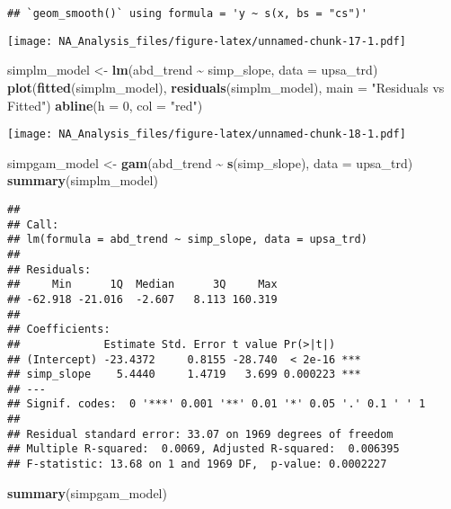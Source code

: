 \documentclass[
]{article}
\newenvironment{Shaded}{\begin{snugshade}}{\end{snugshade}}
\newcommand{\AttributeTok}[1]{\textcolor[rgb]{0.13,0.29,0.53}{#1}}
\newcommand{\DecValTok}[1]{\textcolor[rgb]{0.00,0.00,0.81}{#1}}
\newcommand{\FunctionTok}[1]{\textcolor[rgb]{0.13,0.29,0.53}{\textbf{#1}}}
\newcommand{\NormalTok}[1]{#1}
\newcommand{\OtherTok}[1]{\textcolor[rgb]{0.56,0.35,0.01}{#1}}
\newcommand{\SpecialCharTok}[1]{\textcolor[rgb]{0.81,0.36,0.00}{\textbf{#1}}}
\newcommand{\StringTok}[1]{\textcolor[rgb]{0.31,0.60,0.02}{#1}}
\begin{document}
\begin{verbatim}
## `geom_smooth()` using formula = 'y ~ s(x, bs = "cs")'
\end{verbatim}

\texttt{[image: NA\_Analysis\_files/figure-latex/unnamed-chunk-17-1.pdf]}

\begin{Shaded}
\begin{Highlighting}[]
\NormalTok{simplm\_model }\OtherTok{\textless{}{-}} \FunctionTok{lm}\NormalTok{(abd\_trend }\SpecialCharTok{\textasciitilde{}}\NormalTok{ simp\_slope, }\AttributeTok{data =}\NormalTok{ upsa\_trd)}
\FunctionTok{plot}\NormalTok{(}\FunctionTok{fitted}\NormalTok{(simplm\_model), }\FunctionTok{residuals}\NormalTok{(simplm\_model), }\AttributeTok{main =} \StringTok{"Residuals vs Fitted"}\NormalTok{)}
\FunctionTok{abline}\NormalTok{(}\AttributeTok{h =} \DecValTok{0}\NormalTok{, }\AttributeTok{col =} \StringTok{"red"}\NormalTok{)}
\end{Highlighting}
\end{Shaded}

\texttt{[image: NA\_Analysis\_files/figure-latex/unnamed-chunk-18-1.pdf]}

\begin{Shaded}
\begin{Highlighting}[]
\NormalTok{simpgam\_model }\OtherTok{\textless{}{-}} \FunctionTok{gam}\NormalTok{(abd\_trend }\SpecialCharTok{\textasciitilde{}} \FunctionTok{s}\NormalTok{(simp\_slope), }\AttributeTok{data =}\NormalTok{ upsa\_trd)}
\FunctionTok{summary}\NormalTok{(simplm\_model)}
\end{Highlighting}
\end{Shaded}

\begin{verbatim}
## 
## Call:
## lm(formula = abd_trend ~ simp_slope, data = upsa_trd)
## 
## Residuals:
##     Min      1Q  Median      3Q     Max 
## -62.918 -21.016  -2.607   8.113 160.319 
## 
## Coefficients:
##             Estimate Std. Error t value Pr(>|t|)    
## (Intercept) -23.4372     0.8155 -28.740  < 2e-16 ***
## simp_slope    5.4440     1.4719   3.699 0.000223 ***
## ---
## Signif. codes:  0 '***' 0.001 '**' 0.01 '*' 0.05 '.' 0.1 ' ' 1
## 
## Residual standard error: 33.07 on 1969 degrees of freedom
## Multiple R-squared:  0.0069, Adjusted R-squared:  0.006395 
## F-statistic: 13.68 on 1 and 1969 DF,  p-value: 0.0002227
\end{verbatim}

\begin{Shaded}
\begin{Highlighting}[]
\FunctionTok{summary}\NormalTok{(simpgam\_model)}
\end{Highlighting}
\end{Shaded}
\end{document}
